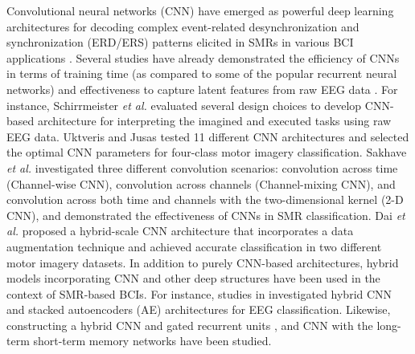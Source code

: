 \documentclass{ieeeaccess}
\begin{document}
Convolutional neural networks (CNN) have emerged as powerful deep learning architectures for decoding complex event-related desynchronization
and synchronization (ERD/ERS) patterns elicited in SMRs in various BCI applications \cite{roy2019deep, zhang2019survey}. Several studies have already demonstrated the efficiency of CNNs in terms of training time (as compared to some of the popular recurrent neural networks) and effectiveness to capture latent features from raw EEG data \cite{aggarwal2019signal}. For instance, Schirrmeister \textit{et al.} \cite{schirrmeister2017deep} evaluated several design choices to develop CNN-based architecture for interpreting the imagined and executed tasks using raw EEG data. Uktveris and Jusas \cite{uktveris2017application} tested 11 different CNN architectures and selected the optimal CNN parameters for four-class motor imagery classification. 
Sakhave \textit{et al.}  \cite{sakhavi2018learning} investigated three different convolution scenarios: convolution across time (Channel-wise CNN), convolution across channels (Channel-mixing CNN), and convolution across both time and channels with the two-dimensional kernel (2-D CNN), and demonstrated the effectiveness of CNNs in SMR classification. Dai \textit{et al.} \cite{dai2019hs} proposed a hybrid-scale CNN architecture that incorporates a data augmentation technique and achieved accurate classification in two different motor imagery datasets. In addition to purely CNN-based architectures, hybrid models incorporating CNN and other deep structures have been used in the context of SMR-based BCIs. For instance, studies in \cite{tabar2016novel, tang2018hybrid, dai2019eeg} investigated hybrid CNN and stacked autoencoders (AE) architectures for EEG classification. Likewise, constructing a hybrid CNN and gated recurrent units \cite{qiao2019deep}, and CNN with the long-term short-term memory networks \cite{zhang2019novel} have been studied.
\end{document}
